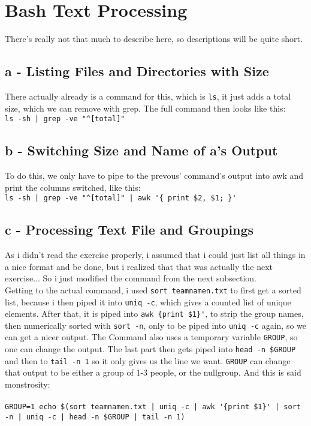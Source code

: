 \documentclass[a4paper, 11pt]{article}
\begin{document}
    \section{Bash Text Processing}
    There's really not that much to describe here, so descriptions will be quite short.
    
    \subsection{a - Listing Files and Directories with Size}
    There actually already is a command for this, which is \texttt{ls}, it just adds a total size, which we can 
    remove with grep. The full command then looks like this:\\ 
    \lstinline{ls -sh | grep -ve "^[total]"}

    \subsection{b - Switching Size and Name of a's Output}
    To do this, we only have to pipe to the prevous' command's output into awk and print the columns switched, 
    like this:\\
    \lstinline+ls -sh | grep -ve "^[total]" | awk '{ print $2, $1; }'+

    \subsection{c - Processing Text File and Groupings}
    As i didn't read the exercise properly, i assumed that i could just list all things in a nice format and be done, 
    but i realized that that was actually the next exercise... So i just modified the command from the next subsection.\\
    Getting to the actual command, i used \lstinline{sort teamnamen.txt} to first get a sorted list, because i then piped it 
    into \lstinline{uniq -c}, which gives a counted list of unique elements. After that, it is piped into \lstinline+awk {print $1}'+, 
    to strip the group names, then numerically sorted with \lstinline{sort -n}, only to be piped into \lstinline{uniq -c} again, so we can get a nicer output.
    The Command also uses a temporary variable \lstinline{GROUP}, so one can change the output. The last part then gets piped into 
    \lstinline{head -n $GROUP} and then to \lstinline{tail -n 1} so it only gives us the line we want. \texttt{GROUP} can change that output to be either a group 
    of 1-3 people, or the nullgroup. And this is said monstrosity:\\\\
    \lstinline+GROUP=1 echo $(sort teamnamen.txt | uniq -c | awk '{print $1}' | sort -n | uniq -c | head -n $GROUP | tail -n 1)+ 
\end{document}
